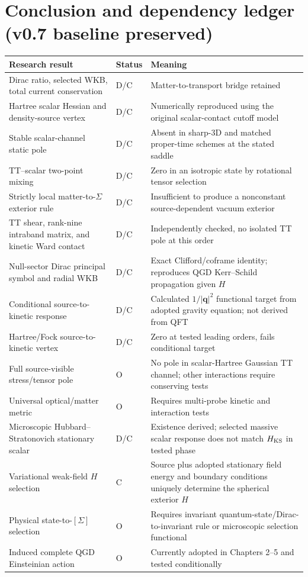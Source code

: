 \documentclass[11pt,a4paper]{article}
\begin{document}
\section{Conclusion and dependency ledger (v0.7 baseline preserved)}
\begin{center}\small
\begin{tabularx}{\linewidth}{@{}>{\raggedright\arraybackslash}p{.31\linewidth}>{\raggedright\arraybackslash}p{.14\linewidth}>{\raggedright\arraybackslash}X@{}}\toprule
Research result&Status&Meaning\\\midrule
Dirac ratio, selected WKB, total current conservation&D/C&Matter-to-transport bridge retained\\
Hartree scalar Hessian and density-source vertex&D/C&Numerically reproduced using the original scalar-contact cutoff model\\
Stable scalar-channel static pole&D/C&Absent in sharp-3D and matched proper-time schemes at the stated saddle\\
TT--scalar two-point mixing&D/C&Zero in an isotropic state by rotational tensor selection\\
Strictly local matter-to-$\Sigma$ exterior rule&D/C&Insufficient to produce a nonconstant source-dependent vacuum exterior\\
TT shear, rank-nine intraband matrix, and kinetic Ward contact&D/C&Independently checked, no isolated TT pole at this order\\
Null-sector Dirac principal symbol and radial WKB&D/C&Exact Clifford/coframe identity; reproduces QGD Kerr--Schild propagation given $H$\\
Conditional source-to-kinetic response&D/C&Calculated $1/|\bm q|^2$ functional target from adopted gravity equation; not derived from QFT\\
Hartree/Fock source-to-kinetic vertex&D/C&Zero at tested leading orders, fails conditional target\\
Full source-visible stress/tensor pole&O&No pole in scalar-Hartree Gaussian TT channel; other interactions require conserving tests\\
Universal optical/matter metric&O&Requires multi-probe kinetic and interaction tests\\
Microscopic Hubbard--Stratonovich stationary scalar&D/C&Existence derived; selected massive scalar response does not match $H_{\rm KS}$ in tested phase\\
Variational weak-field $H$ selection&C&Source plus adopted stationary field energy and boundary conditions uniquely determine the spherical exterior $H$\\
Physical state-to-$[\Sigma]$ selection&O&Requires invariant quantum-state/Dirac-to-invariant rule or microscopic selection functional\\
Induced complete QGD Einsteinian action&O&Currently adopted in Chapters 2--5 and tested conditionally\\\bottomrule
\end{tabularx}
\end{center}
\end{document}
